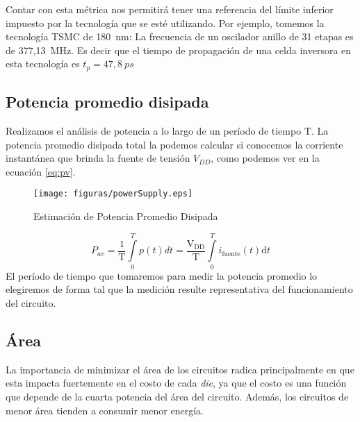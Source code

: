 Contar con esta métrica nos permitirá tener una referencia del límite inferior impuesto por la tecnología que se esté utilizando. Por ejemplo, tomemos la tecnología TSMC de 180~nm: La frecuencia de un oscilador anillo de 31 etapas es de 377,13~MHz. Es decir que el tiempo de propagación de una celda inversora en esta tecnología es $t_p = 47,8~ps$












\subsection{Potencia promedio disipada}
Realizamos el análisis de potencia a lo largo de un período de tiempo $\mathrm{T}$. La potencia promedio disipada total la podemos calcular si conocemos la corriente instantánea que brinda la fuente de tensión $V_{DD}$, como podemos ver en la ecuación \ref{eq:pv}.
\begin{figure}[h]
\centering
\texttt{[image: figuras/powerSupply.eps]}
  \caption{Estimación de Potencia Promedio Disipada }
  \label{fig:powerSupply}
\end{figure}

\begin{equation}
P_{av} = \frac{1}{\mathrm{T}}\int\limits_0^T p(t)dt = \mathrm{\frac{V_{DD}}{T}}\int\limits_0^T i_{\mathrm{fuente}}(t)\mathrm{d}t 
\label{eq:pv}
\end{equation}
El período de tiempo que tomaremos para medir la potencia promedio lo elegiremos de forma tal que la medición resulte representativa del funcionamiento del circuito.

\subsection{Área}
La importancia de minimizar el área de los circuitos radica principalmente en que esta impacta fuertemente en el costo de cada \emph{die}\cite{HennessyPatterson}, ya que el costo es una función que depende de la cuarta potencia del área del circuito\cite{rabaey2003}. Además, los circuitos de menor área tienden a consumir menor energía. 


